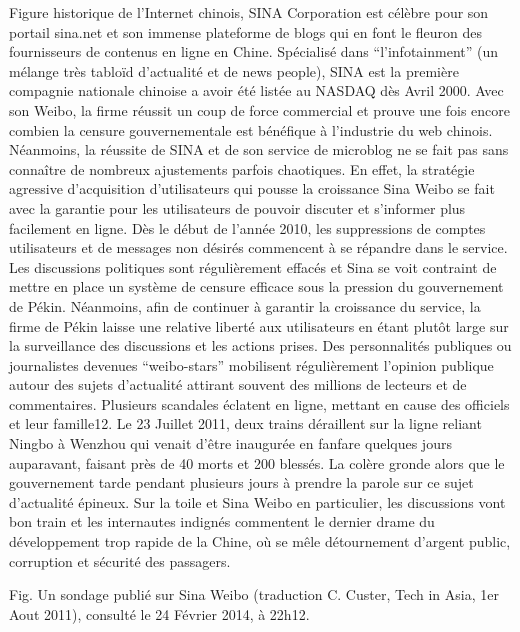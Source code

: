 Figure historique de l’Internet chinois, SINA Corporation est célèbre pour son portail sina.net et son immense plateforme de blogs qui en font le fleuron des fournisseurs de contenus en ligne en Chine. Spécialisé dans “l’infotainment” (un mélange très tabloïd d’actualité et de news people), SINA est la première compagnie nationale chinoise a avoir été listée au NASDAQ dès Avril 2000. Avec son Weibo, la firme réussit un coup de force commercial et prouve une fois encore combien la censure gouvernementale est bénéfique à l’industrie du web chinois. Néanmoins, la réussite de SINA et de son service de microblog ne se fait pas sans connaître de nombreux ajustements parfois chaotiques. En effet, la stratégie agressive d’acquisition d’utilisateurs qui pousse la croissance Sina Weibo se fait avec la garantie pour les utilisateurs de pouvoir discuter et s’informer plus facilement en ligne. Dès le début de l’année 2010, les suppressions de comptes utilisateurs et de messages non désirés commencent à se répandre dans le service. Les discussions politiques sont régulièrement effacés et Sina se voit contraint de mettre en place un système de censure efficace sous la pression du gouvernement de Pékin. Néanmoins, afin de continuer à garantir la croissance du service, la firme de Pékin laisse une relative liberté aux utilisateurs en étant plutôt large sur la surveillance des discussions et les actions prises. Des personnalités publiques ou journalistes devenues “weibo-stars” mobilisent régulièrement l’opinion publique autour des sujets d’actualité attirant souvent des millions de lecteurs et de commentaires. Plusieurs scandales éclatent en ligne, mettant en cause des officiels et leur famille12. Le 23 Juillet 2011, deux trains déraillent sur la ligne reliant Ningbo à Wenzhou qui venait d’être inaugurée en fanfare quelques jours auparavant, faisant près de 40 morts et 200 blessés. La colère gronde alors que le gouvernement tarde pendant plusieurs jours à prendre la parole sur ce sujet d’actualité épineux. Sur la toile et Sina Weibo en particulier, les discussions vont bon train et les internautes indignés commentent le dernier drame du développement trop rapide de la Chine, où se mêle détournement d’argent public, corruption et sécurité des passagers. 


Fig. Un sondage publié sur Sina Weibo (traduction C. Custer, Tech in Asia, 1er Aout 2011), consulté le 24 Février 2014, à 22h12.

